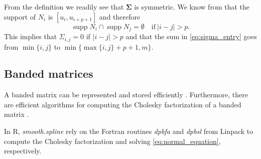 \documentclass[a4paper]{scrartcl}
\newcommand{\mat}[1]{\ensuremath{\bm{#1}}}
\DeclareMathOperator\supp{supp}
\begin{document}
From the definition we readily see that $\mat\Sigma$ is symmetric.
We know from \cite[P2.1]{Piegl:Tiller:1997} that the support of $N_i$ is $[u_i, u_{i+p+1}]$ and therefore 
\begin{equation*}
    \supp N_i \cap \supp N_j = \emptyset
    \quad\text{if}\:
    |i - j| > p.
\end{equation*}
This implies that $\Sigma_{i,j} = 0$ if $|i - j| > p$ and that the sum in \cref{eq:sigma_entry} goes from $\min\{i, j\}$ to $\min\{\max\{i, j\} + p + 1, m\}$.


\subsection{Banded matrices}

A banded matrix can be represented and stored efficiently \cite[Section 1.2.5]{Golub:van_Loan:2013}.
Furthermore, there are efficient algorithms for computing the Cholesky factorization of a banded matrix \cite[Section 4.3]{Golub:van_Loan:2013}.

In R, \textit{smooth.spline} rely on the Fortran routines \textit{dpbfa} and \textit{dpbsl} from Linpack \cite{Dongarra:Moler:Bunch:Stewart:1979} to compute the Cholesky factorization and solving \cref{eq:normal_equation}, respectively.


\printbibliography
\end{document}
